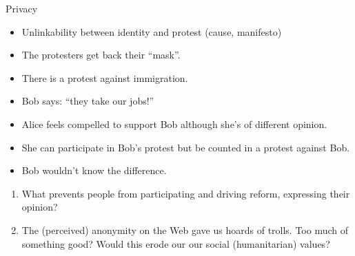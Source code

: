 \begin{frame}
  \begin{block}{Privacy}
    \begin{itemize}
      \item Unlinkability between identity and protest (cause, manifesto)
      \item The protesters get back their \enquote{mask}.
    \end{itemize}
  \end{block}

  \begin{example}
    \begin{itemize}
      \item There is a protest against immigration.
      \item Bob says: \enquote{they take our jobs!}
      \item Alice feels compelled to support Bob although she's of different 
        opinion.
      \item She can participate in Bob's protest but be counted in a protest 
        against Bob.
      \item Bob wouldn't know the difference.
    \end{itemize}
  \end{example}
\end{frame}


\begin{frame}
  \begin{question}
    \begin{enumerate}
      \item What prevents people from participating and driving reform, 
        expressing their opinion?

      \item The (perceived) anonymity on the Web gave us hoards of trolls.
        Too much of something good?
        Would this erode our our social (humanitarian) values?
    \end{enumerate}
  \end{question}
\end{frame}


